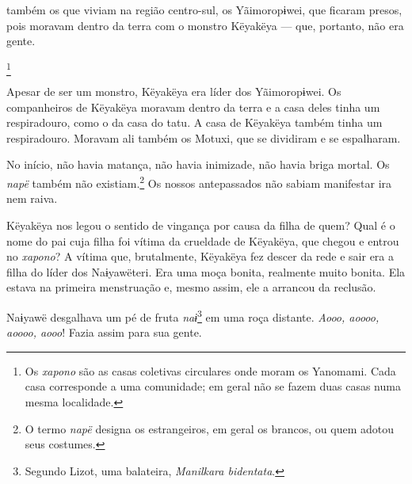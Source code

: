  também os que viviam na região centro-sul, os
Yãimoropɨwei, que ficaram presos, pois moravam dentro da terra com o
monstro Këyakëya --- que, portanto, não era gente. 

\footnote{Os \textit{xapono} são as casas coletivas circulares onde moram os Yanomami. Cada casa corresponde a uma comunidade; em geral não se fazem duas casas numa mesma localidade.} 

Apesar de ser um monstro, Këyakëya era líder dos Yãimoropɨwei. Os
companheiros de Këyakëya moravam dentro da terra e a casa deles tinha um
respiradouro, como o da casa do tatu. A casa de Këyakëya também tinha um
respiradouro. Moravam ali também os Motuxi, que se dividiram e se
espalharam. 


No início, não havia matança, não havia inimizade, não havia briga
mortal. Os \textit{napë} também não existiam.\footnote{O termo \textit{napë} designa os estrangeiros, em geral os brancos, ou quem adotou seus costumes.} Os nossos antepassados não sabiam manifestar ira nem raiva. 


Këyakëya nos legou o sentido de vingança por causa da filha de quem?
Qual é o nome do pai cuja filha foi vítima da crueldade de Këyakëya, que
chegou e entrou no \textit{xapono}? A vítima que, brutalmente, Këyakëya fez
descer da rede e sair era a filha do líder dos Naɨyawëteri. Era uma moça
bonita, realmente muito bonita. Ela estava na primeira menstruação e,
mesmo assim, ele a arrancou da reclusão.


Naɨyawë desgalhava um pé de fruta \textit{naɨ}\footnote{ Segundo Lizot, uma balateira, \textit{Manilkara bidentata}.} em uma roça
distante. \textit{Aooo, aoooo, aoooo, aooo}! Fazia assim para sua gente. 

